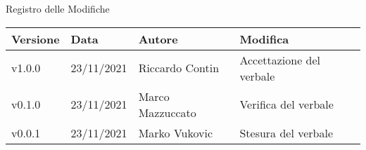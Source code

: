 \begin{center}
  \huge{Registro delle Modifiche}
\end{center}

\begin{center}
  \begin{tabular}{|p{2cm}|p{2cm}|p{3cm}|p{5cm}|}
    \hline
    \textbf{Versione} & \textbf{Data} & \textbf{Autore} & \textbf{Modifica}                    \\ \hline
    v1.0.0            & 23/11/2021    & Riccardo Contin   & Accettazione del verbale \\ \hline
    v0.1.0            & 23/11/2021    & Marco Mazzuccato   & Verifica del verbale \\ \hline
    v0.0.1            & 23/11/2021    & Marko Vukovic   & Stesura del verbale \\ \hline
  \end{tabular}
\end{center}